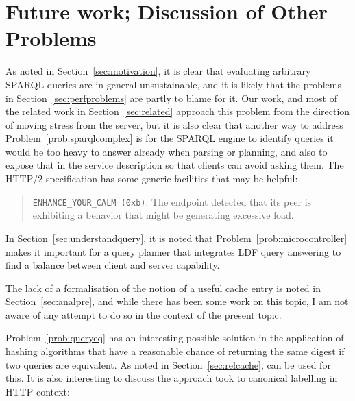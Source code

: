 

\section[Future Work]{Future work; Discussion of Other Problems}\label{sec:future}

As noted in Section~\ref{sec:motivation}, it is clear that evaluating
arbitrary SPARQL queries are in general unsustainable, and it is
likely that the problems in Section~\ref{sec:perfproblems} are partly
to blame for it. Our work, and most of the related work in
Section~\ref{sec:related} approach this problem from the direction of
moving stress from the server, but it is also clear that another way
to address Problem~\ref{prob:sparqlcomplex} is for the SPARQL engine
to identify queries it would be too heavy to answer already when
parsing or planning, and also to expose that in the service description
so that clients can avoid asking them. The HTTP/2 specification
\cite{rfc7540} has some generic facilities that may be helpful: 

\begin{quote}
\texttt{ENHANCE\_YOUR\_CALM (0xb)}:  The endpoint detected that its peer is
      exhibiting a behavior that might be generating excessive load.
\end{quote}

In Section~\ref{sec:understandquery}, it is noted that
Problem~\ref{prob:microcontroller} makes it important for a query
planner that integrates LDF query answering to find a balance between
client and server capability.

The lack of a formalisation of the notion of a useful cache entry is
noted in Section~\ref{sec:analpre}, and while there has been some work
on this topic, I am not aware of any attempt to do so in the context
of the present topic.


Problem~\ref{prob:queryeq} has an interesting possible solution in
the application of hashing algorithms that have a reasonable chance of
returning the same digest if two queries are equivalent. As noted in
Section~\ref{sec:relcache}, \cite{kaseicache} can be used for this. It
is also interesting to discuss the approach \cite{papailiou2015graph}
took to canonical labelling in HTTP context:

